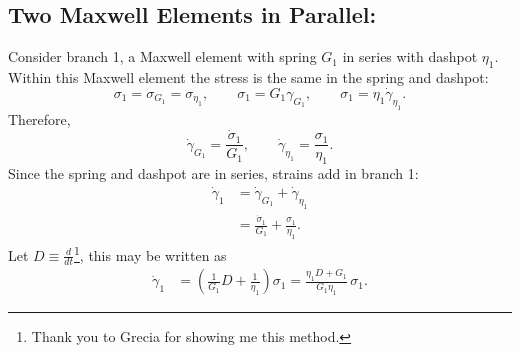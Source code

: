 \documentclass[12pt, a4paper]{article}
\numberwithin{equation}{section}
\begin{document}
\subsection{Two Maxwell Elements in Parallel:}
Consider branch 1, a Maxwell element with spring $G_1$ in series with dashpot $\eta_1$.
Within this Maxwell element the stress is the same in the spring and dashpot:
\[
	\sigma_1 = \sigma_{G_1} = \sigma_{\eta_1},
	\qquad
	\sigma_1 = G_1 \gamma_{G_1},
	\qquad
	\sigma_1 = \eta_1 \dot\gamma_{\eta_1}.
\]
Therefore,
\[
	\dot\gamma_{G_1} = \frac{\dot\sigma_1}{G_1},
	\qquad
	\dot\gamma_{\eta_1} = \frac{\sigma_1}{\eta_1}.
\]
Since the spring and dashpot are in series, strains add in branch 1:
\begin{align*}
	\dot\gamma_1 &= \dot\gamma_{G_1} + \dot\gamma_{\eta_1} \\
	&= \frac{\dot\sigma_1}{G_1} + \frac{\sigma_1}{\eta_1}.
\end{align*}
Let $D \equiv \frac{d}{dt}$\footnote{Thank you to Grecia for showing me this method.}, this may be written as
\begin{align*}
	\dot\gamma_1 &= \left(\frac{1}{G_1}D + \frac{1}{\eta_1}\right)\sigma_1
	= \frac{\eta_1 D + G_1}{G_1\eta_1}\,\sigma_1.
\end{align*}
\end{document}
